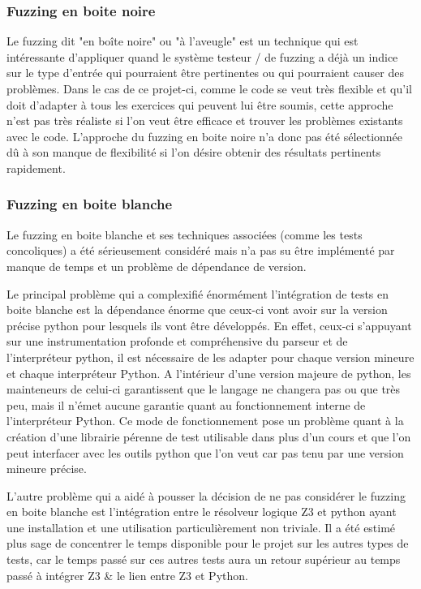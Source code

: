 \documentclass[a4paper]{report}
\begin{document}
\subsubsection{Fuzzing en boite noire}

Le fuzzing dit "en boîte noire" ou "à l'aveugle" est un technique qui est intéressante d'appliquer quand le système testeur / de fuzzing a déjà un indice sur le type d'entrée qui pourraient être pertinentes ou qui pourraient causer des problèmes.
Dans le cas de ce projet-ci, comme le code se veut très flexible et qu'il doit d'adapter à tous les exercices qui peuvent lui être soumis, cette approche n'est pas très réaliste si l'on veut être efficace et trouver les problèmes existants avec le code.
L'approche du fuzzing en boite noire n'a donc pas été sélectionnée dû à son manque de flexibilité si l'on désire obtenir des résultats pertinents rapidement.

\subsubsection{Fuzzing en boite blanche}

Le fuzzing en boite blanche et ses techniques associées (comme les tests concoliques) a été sérieusement considéré mais n'a pas su être implémenté par manque de temps et un problème de dépendance de version.

Le principal problème qui a complexifié énormément l'intégration de tests en boite blanche est la dépendance énorme que ceux-ci vont avoir sur la version précise python pour lesquels ils vont être développés.
En effet, ceux-ci s'appuyant sur une instrumentation profonde et compréhensive du parseur et de l'interpréteur python, il est nécessaire de les adapter pour chaque version mineure et chaque interpréteur Python.
A l'intérieur d'une version majeure de python, les mainteneurs de celui-ci garantissent que le langage ne changera pas ou que très peu, mais il n'émet aucune garantie quant au fonctionnement interne de l'interpréteur Python.
Ce mode de fonctionnement pose un problème quant à la création d'une librairie pérenne de test utilisable dans plus d'un cours et que l'on peut interfacer avec les outils python que l'on veut car pas tenu par une version mineure précise.

L'autre problème qui a aidé à pousser la décision de ne pas considérer le fuzzing en boite blanche est l'intégration entre le résolveur logique Z3 et python ayant une installation et une utilisation particulièrement non triviale.
Il a été estimé plus sage de concentrer le temps disponible pour le projet sur les autres types de tests, car le temps passé sur ces autres tests aura un retour supérieur au temps passé à intégrer Z3 \& le lien entre Z3 et Python.
\end{document}
